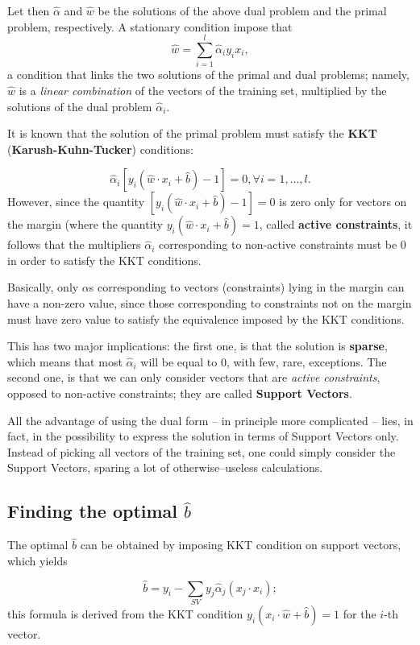 \documentclass[10pt]{report}
\begin{document}
Let then \(\hat{\alpha}\) and \(\hat{w}\) be the solutions of the above
dual problem and the primal problem, respectively. A stationary
condition impose that
\[\hat{w} = \sum_{i=1}^l \hat{\alpha}_ i y_i x_i,\] a condition that
links the two solutions of the primal and dual problems; namely,
\(\hat{w}\) is a \emph{linear combination} of the vectors of the training
set, multiplied by the solutions of the dual problem
\(\hat{\alpha}_ i\).

It is known that the solution of the primal problem must satisfy the \textbf{KKT}
(\textbf{Karush-Kuhn-Tucker}) conditions:

\[\hat{\alpha}_ i [y_i(\hat{w} \cdot x_i + \hat{b}) - 1] = 0, \forall i = 1,\dots, l.\]
However, since the quantity
\([y_i(\hat{w} \cdot x_i + \hat{b}) - 1] = 0\) is zero only for vectors
on the margin (where the quantity
\(y_i(\hat{w} \cdot x_i + \hat{b}) = 1\), called \textbf{active constraints},
it follows that the multipliers \(\hat{\alpha}_ i\) corresponding to
non-active constraints must be \(0\) in order to satisfy the KKT
conditions.

Basically, only \(\alpha\)s corresponding to vectors (constraints) lying
in the margin can have a non-zero value, since those corresponding to
constraints not on the margin must have zero value to satisfy the
equivalence imposed by the KKT conditions.

This has two major implications: the first one, is that the solution is
\textbf{sparse}, which means that most \(\hat{\alpha}_ i\) will be equal to
\(0\), with few, rare, exceptions. The second one, is that we can only
consider vectors that are \emph{active constraints}, opposed to non-active
constraints; they are called \textbf{Support Vectors}.

All the advantage of using the dual form -- in principle more complicated --
lies, in fact, in the possibility to express the solution in terms of Support
Vectors only. Instead of picking all vectors of the training set, one could
simply consider the Support Vectors, sparing a lot of otherwise--useless
calculations.


\subsection{Finding the optimal \(\hat{b}\)}
\label{sec:org3d16723}

The optimal \(\hat{b}\) can be obtained by imposing KKT
condition on support vectors, which yields

\[\hat{b} = y_i - \sum_{SV} y_j \hat{\alpha}_ j (x_j \cdot x_i);\] this
formula is derived from the KKT condition
\(y_i(x_i \cdot \hat{w} + \hat{b}) = 1\) for the \(i\)-th vector.
\end{document}
